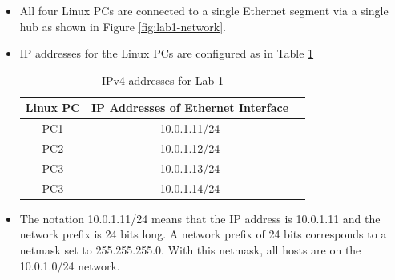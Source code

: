 \begin{itemize}
	\item All four Linux PCs are connected to a single Ethernet segment via a single hub as shown in Figure \ref{fig:lab1-network}.
	\item IP addresses for the Linux PCs are configured as in Table \ref{tab:lab1-ip-addresses}
		\begin{table}[ht]
			\centering
			\begin{tabular}{| c | c | c |}	
				\hline
				\textbf{Linux PC} & \textbf{IP Addresses of Ethernet Interface \iface{eth0}}  \\ \hline
				PC1 & 10.0.1.11/24 \\ 
				PC2 & 10.0.1.12/24 \\
				PC3 & 10.0.1.13/24 \\
				PC3 & 10.0.1.14/24 \\ \hline
			\end{tabular}
			\caption{IPv4 addresses for Lab 1}
			\label{tab:lab1-ip-addresses}
		\end{table}
	\item The notation 10.0.1.11/24 means that the IP address is 10.0.1.11 and the network prefix is 24 bits long. A network prefix of 24 bits corresponds to a netmask set to 255.255.255.0. With this netmask, all hosts are on the 10.0.1.0/24 network.
\end{itemize}


